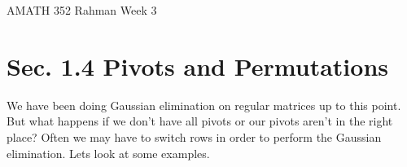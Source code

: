 \documentclass[reqno]{amsart}
\theoremstyle{definition}
\begin{document}
\begin{flushleft}
{\sc \Large AMATH 352 Rahman} \hfill Week 3
\bigskip
\end{flushleft}

\newcommand{\R}{\mathbb{R}}
\newcommand{\N}{\mathbb{N}}
\newcommand{\Z}{\mathbb{Z}}
\newcommand{\Q}{\mathbb{Q}}
\renewcommand{\CancelColor}{\color{red}}
\newcommand{\?}{\stackrel{?}{=}}
\renewcommand{\varphi}{\phi}
\newcommand{\card}{\text{Card}}
\newcommand{\bigzero}{\text{\Huge 0}}
\newcommand{\curvearrowdown}{{\color{red}\rotatebox{90}{$\curvearrowleft$}}}
\newcommand{\curvearrowup}{{\color{red}\rotatebox{90}{$\curvearrowright$}}}



\section*{Sec. 1.4 Pivots and Permutations}

We have been doing Gaussian elimination on regular matrices up to this point.  But what happens if we don't have all pivots or our pivots aren't in the right place?  Often we may have to switch rows in order to perform the Gaussian elimination.  Lets look at some examples.
\end{document}
